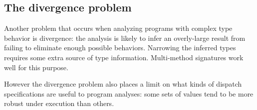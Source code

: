 \subsection{The divergence problem}

Another problem that occurs when analyzing programs with complex
type behavior is divergence: the analysis is likely to infer an
overly-large result from failing to eliminate enough possible
behaviors. Narrowing the inferred types requires some extra source
of type information. Multi-method signatures work well for this
purpose.

However the divergence problem also places a limit on what
kinds of dispatch specifications are useful to program analyses:
some sets of values tend to be more robust under execution
than others.










